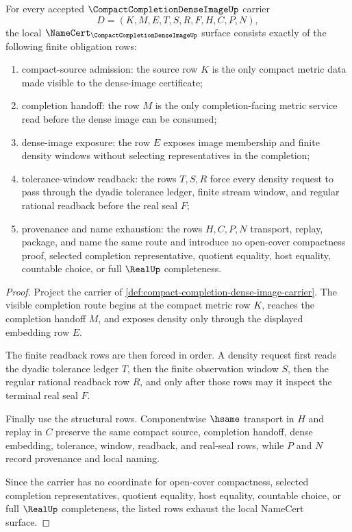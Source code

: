 \begin{theorem}
\label{thm:compact-completion-dense-image-namecert-obligations}
For every accepted $\CompactCompletionDenseImageUp$ carrier
$$
D=(K,M,E,T,S,R,F,H,C,P,N),
$$
the local $\NameCert_{\CompactCompletionDenseImageUp}$ surface consists exactly of the following finite obligation rows:
\begin{enumerate}
\item compact-source admission: the source row $K$ is the only compact metric data made visible to the dense-image certificate;
\item completion handoff: the row $M$ is the only completion-facing metric service read before the dense image can be consumed;
\item dense-image exposure: the row $E$ exposes image membership and finite density windows without selecting representatives in the completion;
\item tolerance-window readback: the rows $T,S,R$ force every density request to pass through the dyadic tolerance ledger, finite stream window, and regular rational readback before the real seal $F$;
\item provenance and name exhaustion: the rows $H,C,P,N$ transport, replay, package, and name the same route and introduce no open-cover compactness proof, selected completion representative, quotient equality, host equality, countable choice, or full $\RealUp$ completeness.
\end{enumerate}
\end{theorem}
\begin{proof}
Project the carrier of \autoref{def:compact-completion-dense-image-carrier}. The visible completion route begins at the compact metric row $K$, reaches the completion handoff $M$, and exposes density only through the displayed embedding row $E$.

The finite readback rows are then forced in order. A density request first reads the dyadic tolerance ledger $T$, then the finite observation window $S$, then the regular rational readback row $R$, and only after those rows may it inspect the terminal real seal $F$.

Finally use the structural rows. Componentwise $\hsame$ transport in $H$ and replay in $C$ preserve the same compact source, completion handoff, dense embedding, tolerance, window, readback, and real-seal rows, while $P$ and $N$ record provenance and local naming.

Since the carrier has no coordinate for open-cover compactness, selected completion representatives, quotient equality, host equality, countable choice, or full $\RealUp$ completeness, the listed rows exhaust the local NameCert surface.
\end{proof}

